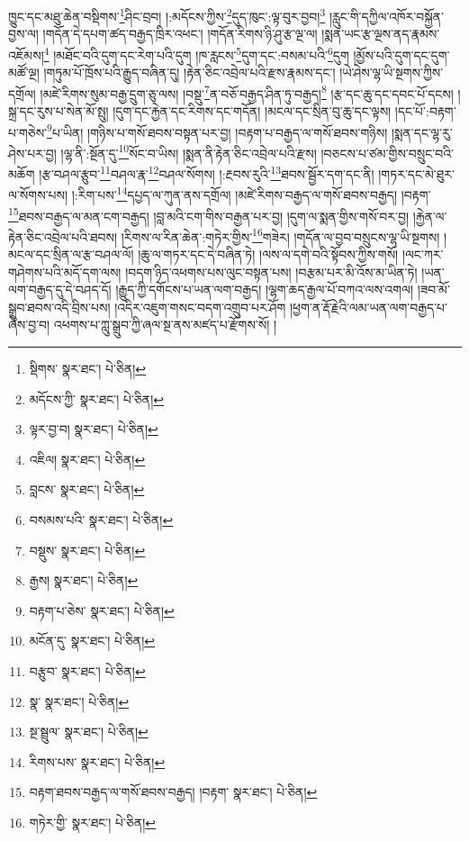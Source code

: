 ཁྱུང་དང་མཐུ་ཆེན་བསྡིགས་\footnote{སྡིགས་  སྣར་ཐང་།  པེ་ཅིན། }ཤིང་བྲབ། །:མདོངས་ཀྱིས་\footnote{མདོངས་ཀྱི་  སྣར་ཐང་།  པེ་ཅིན། }དུད་ཁུང་:ལྟ་བུར་བྱབ།\footnote{ལྟར་བྱ་བ།  སྣར་ཐང་།  པེ་ཅིན། } །རླུང་གི་དཀྱིལ་འཁོར་བསྐྱོན་བྱས་ལ། །གདོན་དེ་དཔག་ཚད་བརྒྱད་ཁྲིར་འཕང་། །གདོན་རིགས་ཉི་ཤུ་རྩ་ལྔ་ལ། །སྨན་ཡང་རྩ་ལྔས་ནད་རྣམས་འཇོམས།\footnote{འཇིལ།  སྣར་ཐང་།  པེ་ཅིན། } །མཐོང་བའི་དུག་དང་རེག་པའི་དུག །ཁ་རླངས་\footnote{བླངས་  སྣར་ཐང་།  པེ་ཅིན། }དུག་དང་:བསམ་པའི་\footnote{བསམས་པའི་  སྣར་ཐང་།  པེ་ཅིན། }དུག །མྱོས་པའི་དུག་དང་དུག་མཚོ་ལྔ། །གཏུམ་པོ་ཁྲོས་པའི་རྒྱུད་བཞིན་དུ། །རྟེན་ཅིང་འབྲེལ་པའི་རྫས་རྣམས་དང་། །ཡེ་ཤེས་ལྷ་ཡི་སྔགས་ཀྱིས་དགྲོལ། །མཛེ་རིགས་སུམ་བརྒྱ་དྲུག་ཅུ་ལས། །བསྡུ་\footnote{བསྡུས་  སྣར་ཐང་།  པེ་ཅིན། }ན་བཅོ་བརྒྱད་ཤིན་ཏུ་བརྒྱད།\footnote{རྒྱས།  སྣར་ཐང་།  པེ་ཅིན། } །རྩ་དང་ཆུ་དང་དབང་པོ་དངས། །སྐྲ་དང་རུས་པ་སེན་མོ་སྤུ། །དུག་དང་རྐྱེན་དང་རིགས་དང་གདོན། །མངལ་དང་སྲིན་བུ་ཆུ་དང་ལྟས། །དང་པོ་:བརྟག་པ་གཅེས་\footnote{བརྟག་པ་ཅེས་  སྣར་ཐང་།  པེ་ཅིན། }པ་ཡིན། །གཉིས་པ་གསོ་ཐབས་བསྟན་པར་བྱ། །བརྟག་པ་བརྒྱད་ལ་གསོ་ཐབས་གཉིས། །སྨན་དང་ལྷ་རུ་ཤེས་པར་བྱ། །ལྷ་ནི་:སྔོན་དུ་\footnote{མངོན་དུ་  སྣར་ཐང་།  པེ་ཅིན། }སོང་བ་ཡིས། །སྨན་ནི་རྟེན་ཅིང་འབྲེལ་པའི་རྫས། །བཅངས་པ་ཙམ་གྱིས་བསྲུང་བའི་མཆོག །རྩ་བཤལ་རྩུབ་\footnote{བརྩུབ་  སྣར་ཐང་།  པེ་ཅིན། }བཤལ་རྣ་\footnote{སྣ་  སྣར་ཐང་།  པེ་ཅིན། }བཤལ་སོགས། །:རྔབས་རུའི་\footnote{སྔ་སྦྲུལ་  སྣར་ཐང་།  པེ་ཅིན། }ཐབས་སྦྱོར་དག་དང་ནི། །གཏར་དང་མེ་ཐུར་ལ་སོགས་པས། །:རིག་པས་\footnote{རིགས་པས་  སྣར་ཐང་།  པེ་ཅིན། }དཔྱད་ལ་ཀུན་ནས་དགྲོལ། །མཛེ་རིགས་བརྒྱད་ལ་གསོ་ཐབས་བརྒྱད། །བརྟག་\footnote{བརྟག་ཐབས་བརྒྱད་ལ་གསོ་ཐབས་བརྒྱད། །བརྟག་  སྣར་ཐང་།  པེ་ཅིན། }ཐབས་བརྒྱད་ལ་མན་ངག་བརྒྱད། །བླ་མའི་ངག་གིས་བརྒྱན་པར་བྱ། །དུག་ལ་སྨན་གྱིས་གསོ་བར་བྱ། །རྐྱེན་ལ་རྟེན་ཅིང་འབྲེལ་པའི་ཐབས། །རིགས་ལ་རིན་ཆེན་:གཏེར་གྱིས་\footnote{གཏེར་གྱི་  སྣར་ཐང་།  པེ་ཅིན། }གཟེར། །གདོན་ལ་བྱབ་བསྲུངས་ལྷ་ཡི་སྔགས། །མངལ་དང་སྲིན་ལ་རྩ་བཤལ་ལོ། །ཆུ་ལ་གཏར་དང་དེ་བཞིན་ཏེ། །ལས་ལ་དགེ་བའི་སྟོབས་ཀྱིས་གསོ། །ལང་ཀར་གཤེགས་པའི་མདོ་དག་ལས། །བདག་ཉིད་འཕགས་པས་ལུང་བསྟན་པས། །བརྩམ་པར་མི་འོས་མ་ཡིན་ཏེ། །ཡན་ལག་བརྒྱད་དུ་དེ་བཤད་དོ། །རྒྱུད་ཀྱི་དགོངས་པ་ཡན་ལག་བརྒྱད། །ལྷག་ཆད་རྒྱལ་པོ་བཀའ་ལས་འགལ། །ཟབ་མོ་སྒྲུབ་ཐབས་འདི་བྲིས་པས། །འདིར་འཇུག་གསང་བདག་འགྲུབ་པར་ཤོག །ཕྱག་ན་རྡོ་རྗེའི་ལམ་ཡན་ལག་བརྒྱད་པ་ཞེས་བྱ་བ། འཕགས་པ་ཀླུ་སྒྲུབ་ཀྱི་ཞལ་སྔ་ནས་མཛད་པ་རྫོགས་སོ། ། 